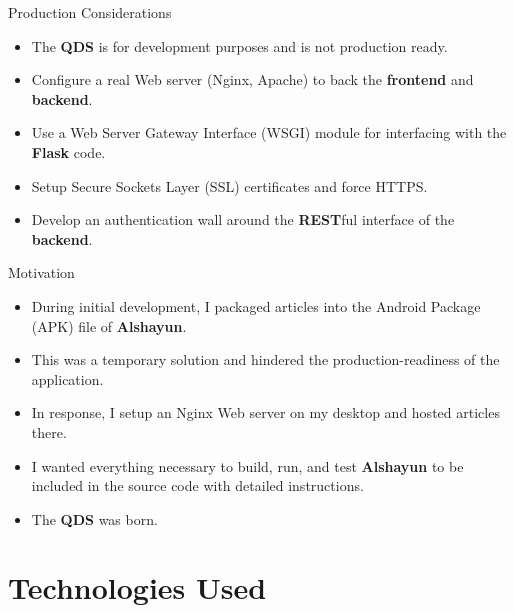 \documentclass{beamer}
\begin{document}
\begin{frame}{Production Considerations}
    \begin{itemize}
        \item The \textbf{QDS} is for development purposes and is not production
            ready.
        \item Configure a real Web server (Nginx, Apache) to back the
            \textbf{frontend} and \textbf{backend}.
        \item Use a Web Server Gateway Interface (WSGI) module for interfacing
            with the \textbf{Flask} code.
        \item Setup Secure Sockets Layer (SSL) certificates and force HTTPS.
        \item Develop an authentication wall around the \textbf{REST}ful
            interface of the \textbf{backend}.
    \end{itemize}
\end{frame}

\begin{frame}{Motivation}
    \begin{itemize}
        \item During initial development, I packaged articles into the Android
            Package (APK) file of \textbf{Alshayun}.
        \item This was a temporary solution and hindered the
            production-readiness of the application.
        \item In response, I setup an Nginx Web server on my desktop and hosted
            articles there.
        \item I wanted everything necessary to build, run, and test
            \textbf{Alshayun} to be included in the source code with detailed
            instructions.
        \item The \textbf{QDS} was born.
    \end{itemize}
\end{frame}

\section{Technologies Used}
\end{document}

